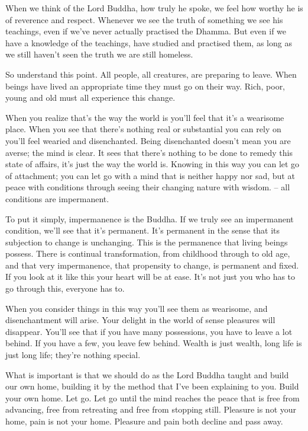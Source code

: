 When we think of the Lord Buddha, how truly he spoke, we feel how worthy he is of reverence and respect. Whenever we see the truth of something we see his teachings, even if we've never actually practised the Dhamma. But even if we have a knowledge of the teachings, have studied and practised them, as long as we still haven't seen the truth we are still homeless.

So understand this point. All people, all creatures, are preparing to leave. When beings have lived an appropriate time they must go on their way. Rich, poor, young and old must all experience this change.

When you realize that's the way the world is you'll feel that it's a wearisome place. When you see that there's nothing real or substantial you can rely on you'll feel wearied and disenchanted. Being disenchanted doesn't mean you are averse; the mind is clear. It sees that there's nothing to be done to remedy this state of affairs, it's just the way the world is. Knowing in this way you can let go of attachment; you can let go with a mind that is neither happy nor sad, but at peace with conditions through seeing their changing nature with wisdom.  -- all conditions are impermanent.

To put it simply, impermanence is the Buddha. If we truly see an impermanent condition, we'll see that it's permanent. It's permanent in the sense that its subjection to change is unchanging. This is the permanence that living beings possess. There is continual transformation, from childhood through to old age, and that very impermanence, that propensity to change, is permanent and fixed. If you look at it like this your heart will be at ease. It's not just you who has to go through this, everyone has to.

When you consider things in this way you'll see them as wearisome, and disenchantment will arise. Your delight in the world of sense pleasures will disappear. You'll see that if you have many possessions, you have to leave a lot behind. If you have a few, you leave few behind. Wealth is just wealth, long life is just long life; they're nothing special.

What is important is that we should do as the Lord Buddha taught and build our own home, building it by the method that I've been explaining to you. Build your own home. Let go. Let go until the mind reaches the peace that is free from advancing, free from retreating and free from stopping still. Pleasure is not your home, pain is not your home. Pleasure and pain both decline and pass away.

